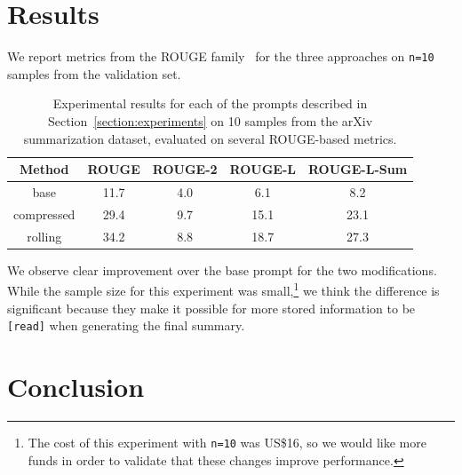 \documentclass{article}
\begin{document}
\section{Results}

We report metrics from the ROUGE family~\cite{lin-hovy-2003-automatic,ganesan2015rouge} for the three approaches on \texttt{n=10} samples from the validation set.

\begin{table}[!ht]
  \centering
  \begin{tabular}{c|c|c|c|c}
    \textbf{Method} & \textbf{ROUGE} & \textbf{ROUGE-2} & \textbf{ROUGE-L} & \textbf{ROUGE-L-Sum} \\
    \hline
    base            & 11.7           & 4.0              & 6.1              & 8.2                  \\
    compressed      & 29.4           & 9.7              & 15.1             & 23.1                 \\
    rolling         & 34.2           & 8.8              & 18.7             & 27.3                 \\
  \end{tabular}
  \vspace{0.5cm}
  \caption{Experimental results for each of the prompts described in Section~\ref{section:experiments} on 10 samples from the arXiv summarization dataset, evaluated on several ROUGE-based metrics.}\label{tab:results}
\end{table}

We observe clear improvement over the base prompt for the two modifications. While the sample size for this experiment was small,\footnote{The cost of this experiment with \texttt{n=10} was US\$16, so we would like more funds in order to validate that these changes improve performance.} we think the difference is significant because they make it possible for more stored information to be \texttt{[read]} when generating the final summary.



\section{Conclusion}
\end{document}

